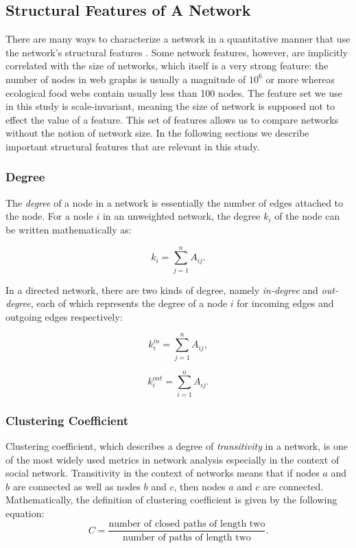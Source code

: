 \documentclass{article}
\begin{document}
	\subsection{Structural Features of A Network}
	There are many ways to characterize a network in a quantitative manner that use the network's structural features \cite{Newman:NetworksIntro,NetworkCharacterizationSurvey}. Some network features, however, are implicitly correlated with the size of networks, which itself is a very strong feature: the number of nodes in web graphs is usually a magnitude of $10^6$ or more whereas ecological food webs contain usually less than 100 nodes. The feature set we use in this study is scale-invariant, meaning the size of network is supposed not to effect the value of a feature. This set of features allows us to compare networks without the notion of network size. In the following sections we describe important structural features that are relevant in this study.
		
	 
	\subsubsection{Degree}
	The \textit{degree} of a node in a network is essentially the number of edges attached to the node. For a node $i$ in an unweighted network, the degree $k_i$ of the node can be written mathematically as:
	
	\begin{equation}
 	 k_i = \sum_{j = 1}^n A_{ij}.
	\end{equation}
	
	In a directed network, there are two kinds of degree, namely \textit{in-degree} and \textit{out-degree}, each of which represents the degree of a node $i$ for incoming edges and outgoing edges respectively:
	
	\begin{equation}
 	 k_i^{in} = \sum_{j = 1}^n A_{ij},
	\end{equation}
	
	\begin{equation}
 	 k_i^{out} = \sum_{i = 1}^n A_{ij}.
	\end{equation}

	
	\subsubsection{Clustering Coefficient}
	Clustering coefficient, which describes a degree of \textit{transitivity} in a network, is one of the most widely used metrics in network analysis especially in the context of social network. Transitivity in the context of networks means that if nodes $a$ and $b$ are connected as well as nodes $b$ and $c$, then nodes $a$ and $c$ are connected. Mathematically, the definition of clustering coefficient is given by the following equation:
	\begin{equation}
	C = \frac{\text{number of closed paths of length two}}{\text{number of paths of length two}}.
	\end{equation}
	
\end{document}
